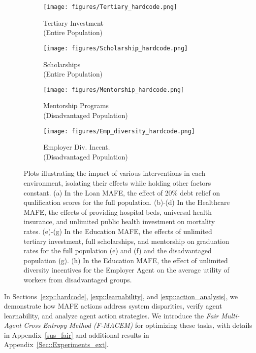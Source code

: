 \begin{figure*}[ht!]
    \vspace{-0mm}
  \begin{subfigure}{0.25\textwidth}
    \texttt{[image: figures/Tertiary\_hardcode.png]}
    \caption{Tertiary Investment\\ (Entire Population)} \label{fig:tert_hardcode}
  \end{subfigure}%
  \hspace*{\fill}   
  \begin{subfigure}{0.25\textwidth}
    \texttt{[image: figures/Scholarship\_hardcode.png]}
    \caption{Scholarships\\ (Entire Population)} \label{fig:scholar_hardcode}
  \end{subfigure}%
  \begin{subfigure}{0.25\textwidth}
    \texttt{[image: figures/Mentorship\_hardcode.png]}
    \caption{Mentorship Programs \\ (Disadvantaged Population)} \label{fig:ment_hardcode}
    \vspace{0.0cm}
  \end{subfigure}%
  \begin{subfigure}{0.25\textwidth}
    \texttt{[image: figures/Emp\_diversity\_hardcode.png]}
    \caption{Employer Div. Incent.\\ (Disadvantaged Population)} \label{fig:div_hardcode}
    \vspace{0cm}
  \end{subfigure}%
\caption{Plots illustrating the impact of various interventions in each environment, isolating their effects while holding other factors constant. (a) In the Loan MAFE, the effect of 20\% debt relief on qualification scores for the full population. (b)-(d) In the Healthcare MAFE, the effects of providing hospital beds, universal health insurance, and unlimited public health investment on mortality rates. (e)-(g) In the Education MAFE, the effects of unlimited tertiary investment, full scholarships, and mentorship on graduation rates for the full population (e) and (f) and the disadvantaged population (g). (h) In the Education MAFE, the effect of unlimited diversity incentives for the Employer Agent on the average utility of workers from disadvantaged groups.} 
\label{fig:hardcode_edu}
\vspace{-3mm}
\end{figure*}

In Sections~\ref{exp::hardcode}, \ref{exp::learnability}, and \ref{exp::action_analysis}, we demonstrate how MAFE actions address system disparities, verify agent learnability, and analyze agent action strategies. We introduce the \textit{Fair Multi-Agent Cross Entropy Method (F-MACEM)} for optimizing these tasks, with details in Appendix~\ref{sus_fair} and additional results in Appendix~\ref{Sec::Experiments_ext}.


